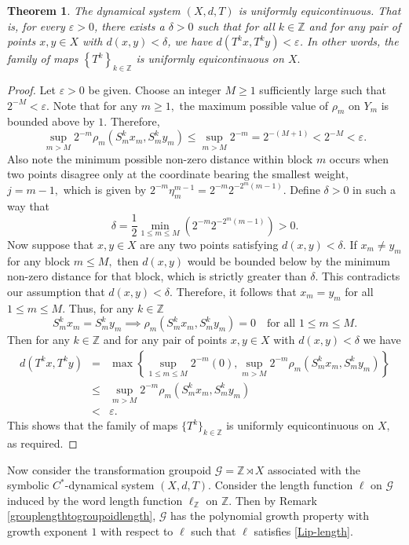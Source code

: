 \documentclass[a4paper,11pt,reqno]{amsart}
\theoremstyle{plain}
\newtheorem{thm}{Theorem}[section]
\theoremstyle{mainthmstyle}
\theoremstyle{named}
\numberwithin{equation}{section}
\newcommand{\Bea}{\begin{eqnarray*}}
\newcommand{\Eea}{\end{eqnarray*}}
\begin{document}
\begin{thm}
The dynamical system $(X, d, T)$ is uniformly equicontinuous. That is, for every $\varepsilon > 0$, there exists a $\delta > 0$ such that for all $k \in \mathbb Z$ and for any pair of points $x, y \in X$ with $d(x, y) < \delta$, we have $d(T^k x, T^k y) < \varepsilon$. In other words, the family of maps $\left \{T^{k} \right \}_{k \in \mathbb Z}$ is uniformly equicontinuous on $X.$
\end{thm}

\begin{proof}
Let $\varepsilon > 0$ be given. Choose an integer $M \ge 1$ sufficiently large such that $2^{-M} < \varepsilon.$
Note that for any $m \geq 1,$ the maximum possible value of $\rho_m$ on $Y_m$ is bounded above by $1.$ Therefore,
$$\sup_{m > M} 2^{-m} \rho_m(S_m^k x_m, S_m^k y_m) \le \sup_{m > M} 2^{-m} = 2^{-(M+1)} < 2^{-M} < \varepsilon.$$
Also note the minimum possible non-zero distance within block $m$ occurs when two points disagree only at the coordinate bearing the smallest weight, $j = m-1,$ which is given by $2^{-m} \eta_m^{m-1} = 2^{-m} 2^{-2^m(m-1)}.$
Define $\delta > 0$ in such a way that
$$ \delta = \frac{1}{2} \min_{1 \leq m \leq M} \left( 2^{-m} 2^{-2^m(m-1)} \right) > 0.$$
Now suppose that $x, y \in X$ are any two points satisfying $d(x, y) < \delta.$
If $x_m \neq y_m$ for any block $m \leq M,$ then $d(x, y)$ would be bounded below by the minimum non-zero distance for that block, which is strictly greater than $\delta.$ This contradicts our assumption that $d(x, y) < \delta.$
Therefore, it follows that $x_m = y_m$ for all $1 \leq m \leq M.$ Thus, for any $k \in \mathbb{Z}$
$$S_m^k x_m = S_m^k y_m \implies \rho_m(S_m^k x_m, S_m^k y_m) = 0 \quad \text{for all } 1 \le m \le M.$$
Then for any $k \in \mathbb Z$ and for any pair of points $x, y \in X$ with $d (x, y) < \delta$ we have
\Bea
d(T^k x, T^k y) & = & \max \left \{ \sup_{1 \le m \le M} 2^{-m}(0), \sup_{m > M} 2^{-m} \rho_m (S_m^k x_m, S_m^k y_m) \right \} \\
& \leq & \sup_{m > M} 2^{-m} \rho_m (S_m^{k} x_m, S_m^{k} y_m) \\
& < & \varepsilon.
\Eea
This shows that the family of maps $\{T^k\}_{k \in \mathbb{Z}}$ is uniformly equicontinuous on $X,$ as required.
\end{proof}
Now consider the transformation groupoid $\mathcal{G}=\mathbb{Z}\rtimes X$ associated with the symbolic $C^{\ast}$-dynamical system $(X,d,T)$. Consider the length function $\ell$ on $\mathcal{G}$ induced by the word length function $\ell_{\mathbb{Z}}$ on $\mathbb{Z}$. Then by Remark \ref{grouplengthtogroupoidlength}, $\mathcal{G}$ has the polynomial growth property with growth exponent $1$ with respect to $\ell$ such that $\ell$ satisfies \ref{Lip-length}.
\end{document}
